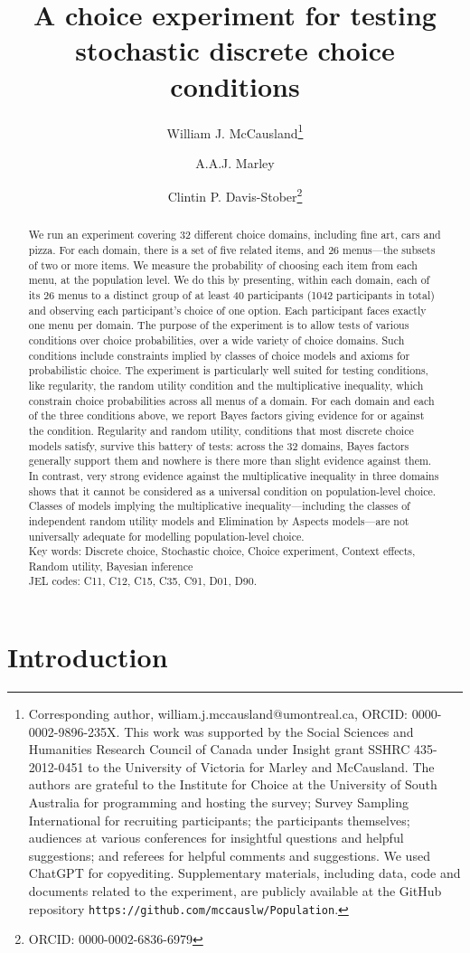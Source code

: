 \documentclass[11pt,letter]{article}
\title{A choice experiment for testing stochastic discrete choice conditions}
\author[1]{William J. McCausland\thanks{Corresponding author, william.j.mccausland@umontreal.ca, ORCID: 0000-0002-9896-235X.
This work was supported by the Social Sciences and Humanities Research Council of Canada under Insight grant SSHRC 435-2012-0451 to the University of Victoria for Marley and McCausland.
The authors are grateful to the Institute for Choice at the University of South Australia for programming and hosting the survey; Survey Sampling International for recruiting participants; the participants themselves; audiences at various conferences for insightful questions and helpful suggestions; and referees for helpful comments and suggestions.
We used ChatGPT for copyediting.
Supplementary materials, including data, code and documents related to the experiment, are publicly available at the GitHub repository \texttt{https://github.com/mccauslw/Population}.}}
\author[2]{A.A.J. Marley}
\author[3]{Clintin P. Davis-Stober\thanks{ORCID: 0000-0002-6836-6979}}
\affil[1]{D\'epartement de sciences \'economiques and CIREQ, Universit\'e de Montr\'eal, Canada}
\affil[2]{Department of Psychology, University of Victoria, Canada}
\affil[3]{Department of Psychological Sciences; MU Institute for Data Science and Informatics, University of Missouri, U.S.A.}
\newcommand{\menu}{menu}
\newcommand{\menus}{menus}
\begin{document}
\maketitle

\begin{abstract}
  We run an experiment covering 32 different choice domains, including fine art, cars and pizza.
  For each domain, there is a set of five related items, and 26 \menus{}---the subsets of two or more items.
  We measure the probability of choosing each item from each \menu{}, at the population level.
  We do this by presenting, within each domain, each of its 26 \menus{} to a distinct group of at least 40 participants (1042 participants in total) and observing each participant's choice of one option.
  Each participant faces exactly one \menu{} per domain.
  The purpose of the experiment is to allow tests of various conditions over choice probabilities, over a wide variety of choice domains.
  Such conditions include constraints implied by classes of choice models and axioms for probabilistic choice.
  The experiment is particularly well suited for testing conditions, like regularity, the random utility condition and the multiplicative inequality, which constrain choice probabilities across all \menus{} of a domain.
  For each domain and each of the three conditions above, we report Bayes factors giving evidence for or against the condition.
  Regularity and random utility, conditions that most discrete choice models satisfy, survive this battery of tests: across the 32 domains, Bayes factors generally support them and nowhere is there more than slight evidence against them.
  In contrast, very strong evidence against the multiplicative inequality in three domains shows that it cannot be considered as a universal condition on population-level choice.
  Classes of models implying the multiplicative inequality---including the classes of independent random utility models and Elimination by Aspects models---are not universally adequate for modelling population-level choice.
  \\
  Key words: Discrete choice, Stochastic choice, Choice experiment, Context effects, Random utility, Bayesian inference \\
  JEL codes: C11, C12, C15, C35, C91, D01, D90.
\end{abstract}


\section{Introduction}\label{s:intro}
\end{document}
